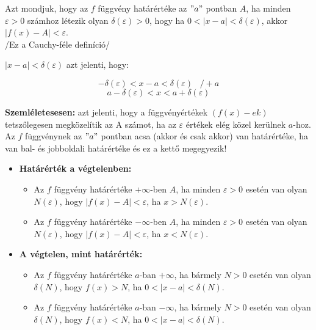 \documentclass[12pt,a4paper]{article}
\begin{document}
\begin{tcolorbox}[colback=green!5!white,colframe=green!60!black,title= 2. Függvény határérték]
Azt mondjuk, hogy az \(f\) függvény határértéke az \("a"\) pontban \(A\), ha minden \(\varepsilon > 0\) számhoz
létezik olyan \(\delta(\varepsilon)  > 0\), hogy ha \(0 < \left\lvert x-a \right\rvert  < \delta(\varepsilon)\), akkor \(|f(x) - A| < \varepsilon\).\\
/Ez a Cauchy-féle definíció/\\
\begin{center}
    \(|x - a| < \delta(\varepsilon)\) azt jelenti, hogy:
\end{center}
    $$- \delta(\varepsilon) < x - a < \delta(\varepsilon) \hspace{10pt} /+a$$
    $$a - \delta(\varepsilon) < x < a + \delta(\varepsilon)$$

\textbf{Szemléletesesen:} azt jelenti, hogy a függvényértékek \((f(x)-ek)\) tetszőlegesen megközelítik az
A számot, ha az \(\varepsilon\) értékek elég közel kerülnek \(a\)-hoz. Az \(f\) függvénynek az \("a"\) pontban acsa (akkor és csak akkor) van határértéke, ha van bal- és
jobboldali határértéke és ez a kettő megegyezik!
\begin{itemize}
    \item \textbf{Határérték a végtelenben:}
    \begin{itemize}
        \item Az \(f\) függvény határértéke \(+\infty\)-ben \(A\), ha minden \(\varepsilon > 0\) esetén van olyan \(N(\varepsilon)\), hogy
    \(|f(x) - A| < \varepsilon\), ha \(x > N(\varepsilon)\).
        \item Az \(f\) függvény határértéke \(-\infty\)-ben \(A\), ha minden \(\varepsilon > 0\) esetén van olyan \(N(\varepsilon)\), hogy
    \(|f(x) - A| < \varepsilon\), ha \(x < N(\varepsilon)\).
    \end{itemize}
    \item \textbf{A végtelen, mint határérték:}
    \begin{itemize}
        \item Az \(f\) függvény határértéke \(a\)-ban \(+ \infty\), ha bármely \(N > 0\) esetén van olyan \(\delta(N)\), hogy \(f(x) > N\), ha \(0 < |x - a| < \delta(N)\).
        \item Az \(f\) függvény határértéke \(a\)-ban \(- \infty\), ha bármely \(N > 0\) esetén van olyan \(\delta(N)\), hogy \(f(x) < N\), ha \(0 < |x - a| < \delta(N)\).
    \end{itemize}
\end{itemize}
\end{tcolorbox}
\end{document}
